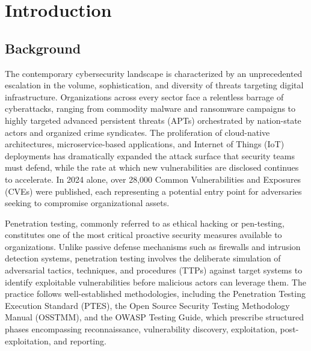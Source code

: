 \chapter{Introduction}
\label{ch:introduction}

\section{Background}
\label{sec:background}

The contemporary cybersecurity landscape is characterized by an unprecedented escalation in the volume, sophistication, and diversity of threats targeting digital infrastructure. Organizations across every sector face a relentless barrage of cyberattacks, ranging from commodity malware and ransomware campaigns to highly targeted advanced persistent threats (APTs) orchestrated by nation-state actors and organized crime syndicates. The proliferation of cloud-native architectures, microservice-based applications, and Internet of Things (IoT) deployments has dramatically expanded the attack surface that security teams must defend, while the rate at which new vulnerabilities are disclosed continues to accelerate. In 2024 alone, over 28,000 Common Vulnerabilities and Exposures (CVEs) were published, each representing a potential entry point for adversaries seeking to compromise organizational assets.

Penetration testing, commonly referred to as ethical hacking or pen-testing, constitutes one of the most critical proactive security measures available to organizations. Unlike passive defense mechanisms such as firewalls and intrusion detection systems, penetration testing involves the deliberate simulation of adversarial tactics, techniques, and procedures (TTPs) against target systems to identify exploitable vulnerabilities before malicious actors can leverage them. The practice follows well-established methodologies, including the Penetration Testing Execution Standard (PTES), the Open Source Security Testing Methodology Manual (OSSTMM), and the OWASP Testing Guide, which prescribe structured phases encompassing reconnaissance, vulnerability discovery, exploitation, post-exploitation, and reporting.

